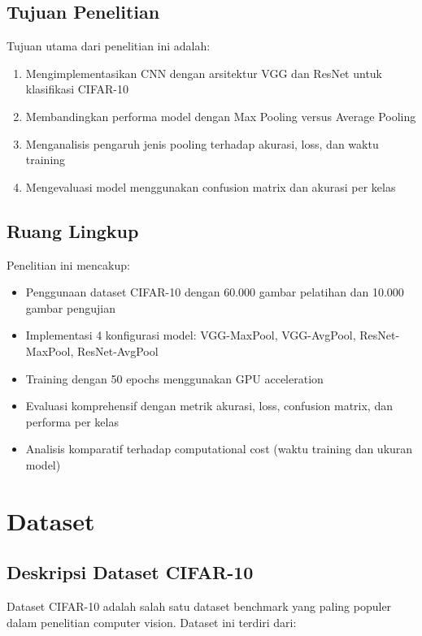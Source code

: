 \documentclass[12pt,a4paper]{report}
\begin{document}
\section{Tujuan Penelitian}

Tujuan utama dari penelitian ini adalah:
\begin{enumerate}
    \item Mengimplementasikan CNN dengan arsitektur VGG dan ResNet untuk klasifikasi CIFAR-10
    \item Membandingkan performa model dengan Max Pooling versus Average Pooling
    \item Menganalisis pengaruh jenis pooling terhadap akurasi, loss, dan waktu training
    \item Mengevaluasi model menggunakan confusion matrix dan akurasi per kelas
\end{enumerate}

\section{Ruang Lingkup}

Penelitian ini mencakup:
\begin{itemize}
    \item Penggunaan dataset CIFAR-10 dengan 60.000 gambar pelatihan dan 10.000 gambar pengujian
    \item Implementasi 4 konfigurasi model: VGG-MaxPool, VGG-AvgPool, ResNet-MaxPool, ResNet-AvgPool
    \item Training dengan 50 epochs menggunakan GPU acceleration
    \item Evaluasi komprehensif dengan metrik akurasi, loss, confusion matrix, dan performa per kelas
    \item Analisis komparatif terhadap computational cost (waktu training dan ukuran model)
\end{itemize}

\chapter{Dataset}

\section{Deskripsi Dataset CIFAR-10}

Dataset CIFAR-10 adalah salah satu dataset benchmark yang paling populer dalam penelitian computer vision. Dataset ini terdiri dari:
\end{document}
